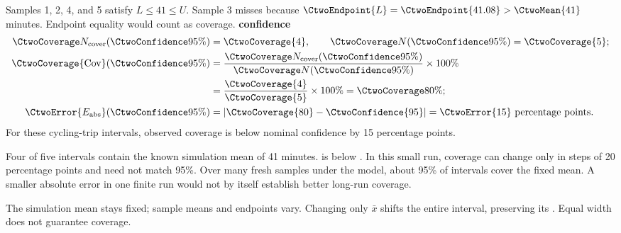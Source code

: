 \clearpage
Samples 1, 2, 4, and 5 satisfy $L\leq41\leq U$. Sample 3 misses because
$\CtwoEndpoint{L}=\CtwoEndpoint{41.08}>\CtwoMean{41}$ minutes.
Endpoint equality would count as coverage.
\textbf{ confidence}\nopagebreak[4]
\begin{align*}
\CtwoCoverCount(\CtwoConfidence{95\%})&=\CtwoCoverage{4},
\qquad\CtwoTotalCount(\CtwoConfidence{95\%})=\CtwoCoverage{5};\\
\CtwoCoverage{\mathrm{Cov}}(\CtwoConfidence{95\%})
&=\frac{\CtwoCoverCount(\CtwoConfidence{95\%})}{\CtwoTotalCount(\CtwoConfidence{95\%})}\times100\%
\\
&=\frac{\CtwoCoverage{4}}{\CtwoCoverage{5}}\times100\%=\CtwoCoverage{80\%};\\
\CtwoError{E_{\rm abs}}(\CtwoConfidence{95\%})
&=\left|\CtwoCoverage{80}-\CtwoConfidence{95}\right|=\CtwoError{15}\ \text{percentage points}.
\end{align*}
For these cycling-trip intervals, observed coverage is below nominal confidence by 15 percentage points.


Four of five intervals contain the known simulation mean of 41 minutes.
 is  below .
In this small run, coverage can change only in steps of 20 percentage points and need not match 95\%.
Over many fresh samples under the model, about 95\% of intervals cover the fixed mean.
A smaller absolute error in one finite run would not by itself establish better long-run coverage.

The simulation mean stays fixed; sample means and endpoints vary.
Changing only $\bar{x}$ shifts the entire interval, preserving its
. Equal width does not guarantee coverage.
\par\vspace{3mm}

\clearpage
